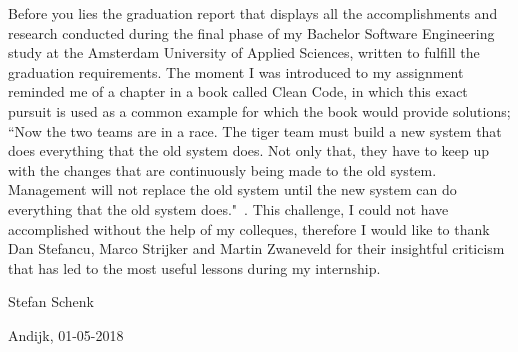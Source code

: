 
\begin{acknowledgements}

  Before you lies the graduation report that displays all the accomplishments and research conducted during the final phase of my Bachelor Software Engineering study at the Amsterdam University of Applied Sciences, written to fulfill the graduation requirements. The moment I was introduced to my assignment reminded me of a chapter in a book called Clean Code, in which this exact pursuit is used as a common example for which the book would provide solutions; “Now the two teams are in a race. The tiger team must build a new system that does everything that the old system does. Not only that, they have to keep up with the changes that are continuously being made to the old system. Management will not replace the old system until the new system can do everything that the old system does."~\citep{CleanCode}. This challenge, I could not have accomplished without the help of my colleques, therefore I would like to thank Dan Stefancu, Marco Strijker and Martin Zwaneveld for their insightful criticism that has led to the most useful lessons during my internship.

  Stefan Schenk

  Andijk, 01-05-2018

\end{acknowledgements}
